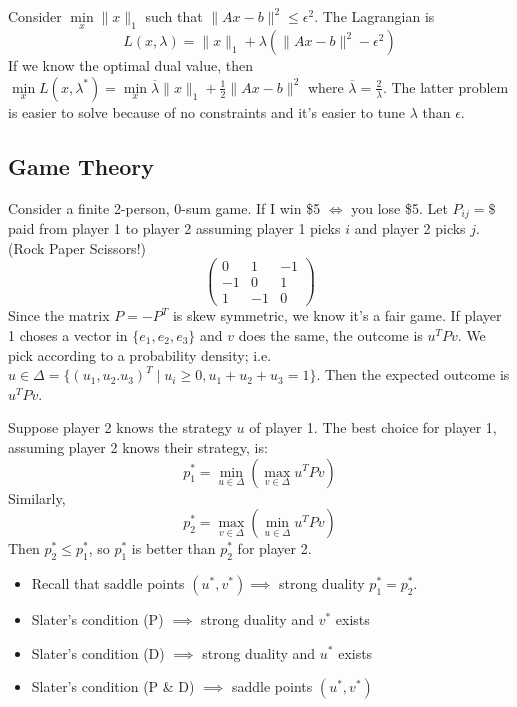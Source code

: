 \documentclass[english, 11pt]{article}
\begin{document}
\begin{exmp}
Consider $\min \limits_x \|x\|_1$ such that $\|Ax-b\|^2 \le \epsilon^2$. The Lagrangian is
\[
L(x,\lambda) = \|x\|_1 + \lambda( \|Ax-b\|^2 - \epsilon^2 )
\]
If we know the optimal dual value, then $\min \limits_x L(x,\lambda^*) = \min \limits_x \overline{\lambda} \|x\|_1 + \frac{1}{2} \|Ax-b\|^2$ where $\overline{\lambda} = \frac{2}{\lambda}$. The latter problem is easier to solve because of no constraints and it's easier to tune $\lambda$ than $\epsilon$.
\end{exmp}

\subsection{Game Theory}
Consider a finite 2-person, 0-sum game. If I win \$5 $\iff$ you lose \$5. 
Let $P_{ij} = \$$ paid from player 1 to player 2 assuming player 1 picks $i$ and player 2 picks $j$. (Rock Paper Scissors!)
\[
\begin{pmatrix}
0 & 1 & -1 \\
-1 & 0 & 1 \\
1 & -1 & 0
\end{pmatrix}
\]
Since the matrix $P = -P^T$ is skew symmetric, we know it's a fair game. If player 1 choses a vector in $\{ e_1,e_2,e_3 \}$ and $v$ does the same, the outcome is $u^T P v$. We pick according to a probability density; i.e.\ $u \in \Delta = \{ (u_1,u_2.u_3)^T \mid u_i \ge 0, u_1+u_2+u_3=1 \}$. Then the expected outcome is $u^T P v$.

Suppose player 2 knows the strategy $u$ of player 1. The best choice for player 1, assuming player 2 knows their strategy, is:
\[
p_1^* = \min \limits_{u \in \Delta} \left( \max \limits_{v \in \Delta} u^T P v \right)
\]
Similarly,
\[
p_2^* = \max \limits_{v \in \Delta} \left( \min \limits_{u \in \Delta} u^T P v \right)
\]
Then $p_2^* \le p_1^*$, so $p_1^*$ is better than $p_2^*$ for player 2.
\begin{itemize}
\item Recall that saddle points $(u^*,v^*) \implies$ strong duality $p_1^* = p_2^*$. 

\item Slater's condition (P) $\implies$ strong duality and $v^*$ exists

\item Slater's condition (D) $\implies$ strong duality and $u^*$ exists

\item Slater's condition (P \& D) $\implies$ saddle points $(u^*,v^*)$

\end{itemize}
\end{document}
